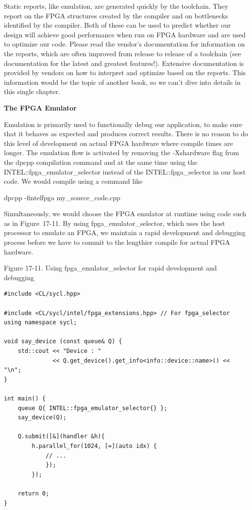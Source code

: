 Static reports, like emulation, are generated quickly by the toolchain. They report on the FPGA structures created by the compiler and on bottlenecks identified by the compiler. Both of these can be used to predict whether our design will achieve good performance when run on FPGA hardware and are used to optimize our code. Please read the vendor’s documentation for information on the reports, which are often improved from release to release of a toolchain (see documentation for the latest and greatest features!). Extensive documentation is provided by vendors on how to interpret and optimize based on the reports. This information would be the topic of another book, so we can’t dive into details in this single chapter.\par

\hspace*{\fill} \par %
\textbf{The FPGA Emulator}

Emulation is primarily used to functionally debug our application, to make sure that it behaves as expected and produces correct results. There is no reason to do this level of development on actual FPGA hardware where compile times are longer. The emulation flow is activated by removing the -Xshardware flag from the dpcpp compilation command and at the same time using the INTEL::fpga\_emulator\_selector instead of the INTEL::fpga\_selector in our host code. We would compile using a command like\par

\begin{tcolorbox}[colback=white,colframe=black]
dpcpp -fintelfpga my\_source\_code.cpp
\end{tcolorbox}

Simultaneously, we would choose the FPGA emulator at runtime using code such as in Figure 17-11. By using fpga\_emulator\_selector, which uses the host processor to emulate an FPGA, we maintain a rapid development and debugging process before we have to commit to the lengthier compile for actual FPGA hardware.\par

\hspace*{\fill} \par %
Figure 17-11. Using fpga\_emulator\_selector for rapid development and debugging
\begin{lstlisting}[caption={}]
#include <CL/sycl.hpp>

#include <CL/sycl/intel/fpga_extensions.hpp> // For fpga_selector
using namespace sycl;

void say_device (const queue& Q) {
	std::cout << "Device : "
			  << Q.get_device().get_info<info::device::name>() << "\n";
}

int main() {
	queue Q{ INTEL::fpga_emulator_selector{} };
	say_device(Q);
	
	Q.submit([&](handler &h){
		h.parallel_for(1024, [=](auto idx) {
			// ...
			});
		});

	return 0;
}
\end{lstlisting}

